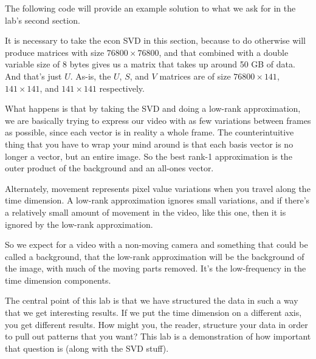 The following code will provide an example solution to what we ask for in the lab's second section.


It is necessary to take the econ SVD in this section, because to do otherwise will produce matrices with size $76800 \times 76800$, and that combined with a double variable size of 8 bytes gives us a matrix that takes up around 50 GB of data. And that's just $U$. As-is, the $U$, $S$, and $V$ matrices are of size $76800\times 141$, $141 \times 141$, and $141 \times 141$ respectively. 

What happens is that by taking the SVD and doing a low-rank approximation, we are basically trying to express our video with as few variations between frames as possible, since each vector is in reality a whole frame. The counterintuitive thing that you have to wrap your mind around is that each basis vector is no longer a vector, but an entire image. So the best rank-1 approximation is the outer product of the background and an all-ones vector.

Alternately, movement represents pixel value variations when you travel along the time dimension. A low-rank approximation ignores small variations, and if there's a relatively small amount of movement in the video, like this one, then it is ignored by the low-rank approximation.

So we expect for a video with a non-moving camera and something that could be called a background, that the low-rank approximation will be the background of the image, with much of the moving parts removed. It's the low-frequency in the time dimension components.

The central point of this lab is that we have structured the data in such a way that we get interesting results. If we put the time dimension on a different axis, you get different results. How might you, the reader, structure your data in order to pull out patterns that you want? This lab is a demonstration of how important that question is (along with the SVD stuff).